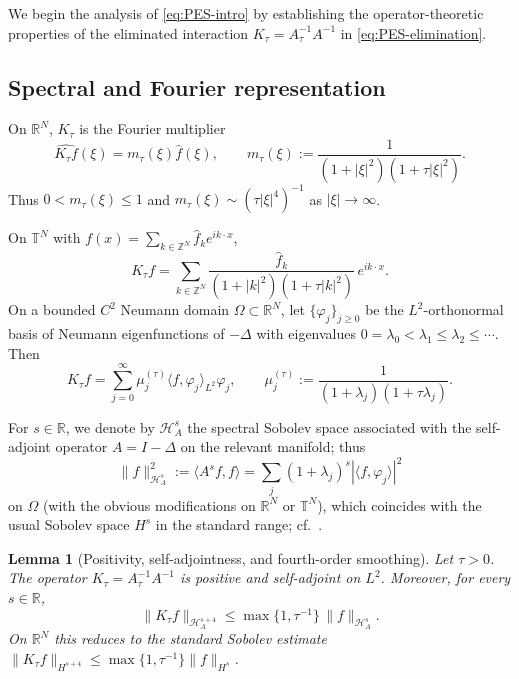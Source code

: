 \documentclass[11pt,reqno]{amsart}
\newtheorem{lemma}[theorem]{Lemma}
\theoremstyle{definition}
\theoremstyle{remark}
\newcommand{\R}{\mathbb{R}}
\newcommand{\T}{\mathbb{T}}
\newcommand{\Z}{\mathbb{Z}}
\newcommand{\Hil}{\mathcal{H}}
\begin{document}
We begin the analysis of \eqref{eq:PES-intro} by establishing the operator-theoretic properties of the eliminated interaction $K_\tau=A_\tau^{-1}A^{-1}$ in \eqref{eq:PES-elimination}.

\subsection{Spectral and Fourier representation}
\label{subsec:Ktau-rep}

On $\R^{N}$, $K_\tau$ is the Fourier multiplier
\begin{equation}\label{eq:Ktau-symbol}
        \widehat{K_\tau f}(\xi)=m_\tau(\xi)\widehat f(\xi),
        \qquad
        m_\tau(\xi):=\frac{1}{(1+|\xi|^{2})(1+\tau|\xi|^{2})}.
\end{equation}
Thus $0<m_\tau(\xi)\le 1$ and $m_\tau(\xi)\sim (\tau|\xi|^{4})^{-1}$ as $|\xi|\to\infty$.

On $\T^{N}$ with $f(x)=\sum_{k\in\Z^{N}}\widehat f_k e^{ik\cdot x}$,
\begin{equation}\label{eq:Ktau-torus}
        K_\tau f
        =\sum_{k\in\Z^{N}}
        \frac{\widehat f_k}{(1+|k|^{2})(1+\tau|k|^{2})}\,e^{ik\cdot x}.
\end{equation}
On a bounded $C^{2}$ Neumann domain $\Omega\subset\R^{N}$, let $\{\varphi_j\}_{j\ge 0}$ be the $L^{2}$-orthonormal basis of Neumann eigenfunctions of $-\Delta$ with eigenvalues $0=\lambda_0<\lambda_1\le\lambda_2\le\cdots$. Then
\begin{equation}\label{eq:Ktau-spectral}
        K_\tau f
        =\sum_{j=0}^{\infty}
        \mu_j^{(\tau)}\langle f,\varphi_j\rangle_{L^{2}}\varphi_j,
        \qquad
        \mu_j^{(\tau)}:=\frac{1}{(1+\lambda_j)(1+\tau\lambda_j)}.
\end{equation}

For $s\in\R$, we denote by $\Hil_A^{s}$ the spectral Sobolev space associated with the self-adjoint operator $A=I-\Delta$ on the relevant manifold; thus
\[
        \|f\|_{\Hil_A^{s}}^{2}
        :=\langle A^{s}f,f\rangle
        =\sum_{j}(1+\lambda_j)^{s}|\langle f,\varphi_j\rangle|^{2}
\]
on $\Omega$ (with the obvious modifications on $\R^{N}$ or $\T^{N}$), which coincides with the usual Sobolev space $H^{s}$ in the standard range; cf.~\cite{triebel1992theory}.

\begin{lemma}[Positivity, self-adjointness, and fourth-order smoothing]\label{lem:Ktau-smoothing}
Let $\tau>0$. The operator $K_\tau=A_\tau^{-1}A^{-1}$ is positive and self-adjoint on $L^{2}$. Moreover, for every $s\in\R$,
\begin{equation}\label{eq:Ktau-Hs-smoothing}
        \|K_\tau f\|_{\Hil_A^{s+4}}\le \max\{1,\tau^{-1}\}\,\|f\|_{\Hil_A^{s}}.
\end{equation}
On $\R^{N}$ this reduces to the standard Sobolev estimate $\|K_\tau f\|_{H^{s+4}}\le \max\{1,\tau^{-1}\}\|f\|_{H^{s}}$.
\end{lemma}
\end{document}

